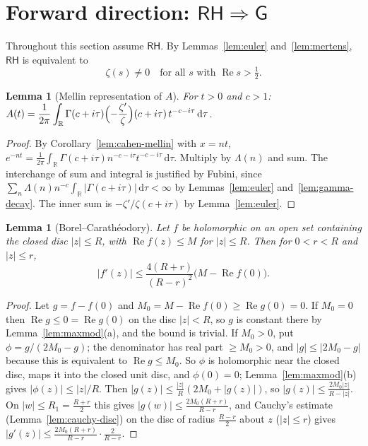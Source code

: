 \documentclass[11pt]{article}
\newtheorem{lemma}[theorem]{Lemma}
\theoremstyle{definition}
\newcommand{\R}{\mathbb{R}}
\newcommand{\Lam}{\Lambda}
\newcommand{\re}{\operatorname{Re}}
\newcommand{\RH}{\mathsf{RH}}
\newcommand{\GR}{\mathsf{G}}
\newcommand{\dd}{\,\mathrm{d}}
\begin{document}
\section{Forward direction: \texorpdfstring{$\RH\Rightarrow\GR$}{RH implies G}}\label{sec:forward}

Throughout this section assume $\RH$. By Lemmas~\ref{lem:euler} and~\ref{lem:mertens}, $\RH$ is equivalent to
\begin{equation}\label{eq:RHprime}
\zeta(s)\ne0\quad\text{for all }s\text{ with }\re s>\tfrac12 .
\end{equation}

\begin{lemma}[Mellin representation of $A$]\label{lem:mellin-A}
For $t>0$ and $c>1$:
$\displaystyle A(t)=\frac1{2\pi}\int_\R\Gamma(c+i\tau)\Bigl(-\frac{\zeta'}{\zeta}\Bigr)(c+i\tau)\,t^{-c-i\tau}\dd\tau$.
\end{lemma}
\begin{proof}
By Corollary~\ref{lem:cahen-mellin} with $x=nt$, $e^{-nt}=\frac1{2\pi}\int_\R\Gamma(c+i\tau)n^{-c-i\tau}t^{-c-i\tau}\dd\tau$.
Multiply by $\Lam(n)$ and sum. The interchange of sum and integral is justified by Fubini, since
$\sum_n\Lam(n)n^{-c}\int_\R|\Gamma(c+i\tau)|\dd\tau<\infty$ by Lemmas~\ref{lem:euler} and~\ref{lem:gamma-decay}.
The inner sum is $-\zeta'/\zeta(c+i\tau)$ by Lemma~\ref{lem:euler}.
\end{proof}

\begin{lemma}[Borel--Carath\'eodory]\label{lem:BC}
Let $f$ be holomorphic on an open set containing the closed disc $|z|\le R$, with $\re f(z)\le M$ for $|z|\le R$.
Then for $0<r<R$ and $|z|\le r$,
\[
|f'(z)|\le\frac{4(R+r)}{(R-r)^{2}}\bigl(M-\re f(0)\bigr).
\]
\end{lemma}
\begin{proof}
Let $g=f-f(0)$ and $M_0=M-\re f(0)\ge\re g(0)=0$.
If $M_0=0$ then $\re g\le0=\re g(0)$ on the disc $|z|<R$, so $g$ is constant there by Lemma~\ref{lem:maxmod}(a), and the bound is trivial.
If $M_0>0$, put $\phi=g/(2M_0-g)$; the denominator has real part $\ge M_0>0$, and $|g|\le|2M_0-g|$ because this is equivalent to $\re g\le M_0$. So $\phi$ is holomorphic near the closed disc, maps it into the closed unit disc, and $\phi(0)=0$; Lemma~\ref{lem:maxmod}(b) gives $|\phi(z)|\le|z|/R$.
Then $|g(z)|\le\frac{|z|}{R}(2M_0+|g(z)|)$, so $|g(z)|\le\frac{2M_0|z|}{R-|z|}$.
On $|w|\le R_1=\frac{R+r}{2}$ this gives $|g(w)|\le\frac{2M_0(R+r)}{R-r}$, and Cauchy's estimate (Lemma~\ref{lem:cauchy-disc}) on the disc of radius $\frac{R-r}{2}$ about $z$ ($|z|\le r$) gives $|g'(z)|\le\frac{2M_0(R+r)}{R-r}\cdot\frac{2}{R-r}$.
\end{proof}
\end{document}
